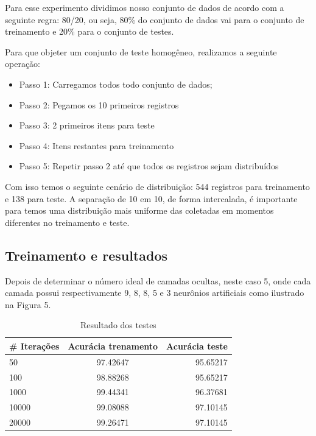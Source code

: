 \documentclass[conference]{IEEEtran}
\begin{document}
    Para esse experimento dividimos nosso conjunto de dados de acordo com a seguinte regra: 80/20, ou seja, 80\% do conjunto de dados vai para o conjunto de treinamento e 20\% para o conjunto de testes. 
    
    Para que objeter um conjunto de teste homogêneo, realizamos a seguinte operação:
    
    \begin{itemize}
    
    \item Passo 1: Carregamos todos todo conjunto de dados;
    \item Passo 2: Pegamos os 10 primeiros registros
    \item Passo 3: 2 primeiros itens para teste
    \item Passo 4: Itens restantes para treinamento
    \item Passo 5: Repetir passo 2 até que todos os registros sejam distribuídos
    
    \end{itemize}
    
    Com isso temos o seguinte cenário de distribuição: 544 registros para treinamento e 138 para teste. A separação de 10 em 10, de forma intercalada, é importante para temos uma distribuição mais uniforme das coletadas em momentos diferentes no treinamento e teste.
    

    \subsection{Treinamento e resultados}
    
    Depois de determinar o número ideal de camadas ocultas, neste caso 5, onde cada camada possui respectivamente 9, 8, 8, 5 e 3 neurônios artificiais como ilustrado na Figura 5.
     
         \begin{table}[]
	\caption{Resultado dos testes}
	\begin{center}
    \begin{tabular}{l | c | r }
    \hline
         \# Iterações &Acurácia trenamento  & Acurácia teste \\\hline
         50 &97.42647  &95.65217    \\\hline
         100 &98.88268  &95.65217    \\\hline
         1000 &99.44341  &96.37681    \\\hline
         10000 &99.08088  &97.10145   \\\hline
         20000 &99.26471  &97.10145  \\\hline
    \end{tabular}
    \end{center}
    \end{table}
     
\end{document}
